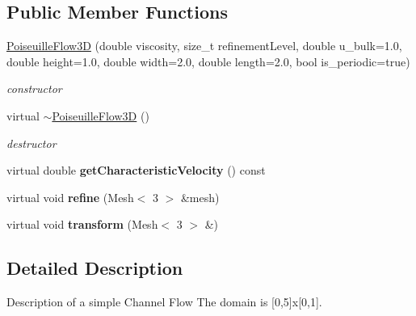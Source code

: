\subsection*{Public Member Functions}
\begin{DoxyCompactItemize}
\item 
\hyperlink{classnatrium_1_1PoiseuilleFlow3D_a65444fdaec3bb59ab98870acfcb297f1}{PoiseuilleFlow3D} (double viscosity, size\_\-t refinementLevel, double u\_\-bulk=1.0, double height=1.0, double width=2.0, double length=2.0, bool is\_\-periodic=true)
\begin{DoxyCompactList}\small\item\em constructor \item\end{DoxyCompactList}\item 
\hypertarget{classnatrium_1_1PoiseuilleFlow3D_a79c1655f3e863583bf8752550f3448bf}{
virtual \hyperlink{classnatrium_1_1PoiseuilleFlow3D_a79c1655f3e863583bf8752550f3448bf}{$\sim$PoiseuilleFlow3D} ()}
\label{classnatrium_1_1PoiseuilleFlow3D_a79c1655f3e863583bf8752550f3448bf}

\begin{DoxyCompactList}\small\item\em destructor \item\end{DoxyCompactList}\item 
\hypertarget{classnatrium_1_1PoiseuilleFlow3D_a78bb2ddc867df9204ec2fa5cda48c7d9}{
virtual double {\bfseries getCharacteristicVelocity} () const }
\label{classnatrium_1_1PoiseuilleFlow3D_a78bb2ddc867df9204ec2fa5cda48c7d9}

\item 
\hypertarget{classnatrium_1_1PoiseuilleFlow3D_a80c9ef01d1629030d52be9a6a005cc66}{
virtual void {\bfseries refine} (Mesh$<$ 3 $>$ \&mesh)}
\label{classnatrium_1_1PoiseuilleFlow3D_a80c9ef01d1629030d52be9a6a005cc66}

\item 
\hypertarget{classnatrium_1_1PoiseuilleFlow3D_ae9cc344fb2f2c1badd80e43341dbb3fe}{
virtual void {\bfseries transform} (Mesh$<$ 3 $>$ \&)}
\label{classnatrium_1_1PoiseuilleFlow3D_ae9cc344fb2f2c1badd80e43341dbb3fe}

\end{DoxyCompactItemize}


\subsection{Detailed Description}
Description of a simple Channel Flow The domain is \mbox{[}0,5\mbox{]}x\mbox{[}0,1\mbox{]}. 


